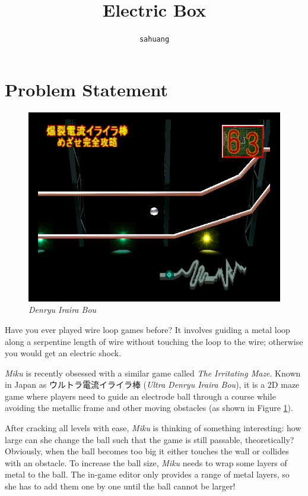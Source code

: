 \documentclass[12pt]{article}
\title{\textbf{Electric Box}}
\author{\texttt{sahuang}}
\date{}
\begin{document}
\allsectionsfont{\bfseries\sffamily}
\maketitle
\thispagestyle{fancy}

\section{Problem Statement}

\begin{figure}[h]
    \centering
    \includegraphics[scale=0.5]{utchan.png}
    \caption{\textit{Denryu Iraira Bou}}
    \label{fig:iraira}
\end{figure}

Have you ever played wire loop games before? It involves guiding a metal loop along a serpentine length of wire without touching the loop to the wire; otherwise you would get an electric shock.

\textit{Miku} is recently obsessed with a similar game called \textit{The Irritating Maze}. Known in Japan as ウルトラ電流イライラ棒 (\textit{Ultra Denryu Iraira Bou}), it is a 2D maze game where players need to guide an electrode ball through a course while avoiding the metallic frame and other moving obstacles (as shown in Figure \ref{fig:iraira}).

After cracking all levels with ease, \textit{Miku} is thinking of something interesting: how large can she change the ball  such that the game is still passable, theoretically? Obviously, when the ball becomes too big it either touches the wall or collides with an obstacle. To increase the ball size, \textit{Miku} needs to wrap some layers of metal to the ball. The in-game editor only provides a range of metal layers, so she has to add them one by one until the ball cannot be larger!
\end{document}
